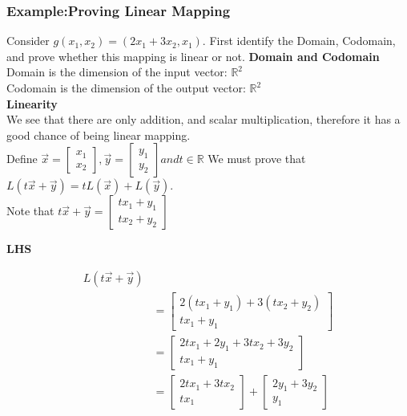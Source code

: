 \documentclass[12pt]{article}
\newcommand{\R}{\mathbb{R}}
\begin{document}
\subsubsection{Example:Proving Linear Mapping}
Consider $g(x_1,x_2) = (2x_1+3x_2 , x_1)$. First identify the Domain, Codomain, and prove whether this mapping is linear or not.
\noindent
\textbf{Domain and Codomain}\\
Domain is the dimension of the input vector: $\R^2$\\
Codomain is the dimension of the output vector: $\R^2$\\
\textbf{Linearity}\\
We see that there are only addition, and scalar multiplication, therefore it has a good chance of being linear mapping.\\
Define $\vec{x} = \begin{bmatrix}x_1\\x_2\end{bmatrix}, \vec{y} = \begin{bmatrix}y_1\\y_2\end{bmatrix} and t \in \R$
We must prove that $L(t\vec{x}+\vec{y}) =tL(\vec{x}) + L(\vec{y})$.\\
Note that $t\vec{x} + \vec{y} = \begin{bmatrix}tx_1+y_1\\tx_2+y_2\end{bmatrix}$\\
\begin{center}
\textbf{LHS}\\
\end{center}
\begin{equation}
\begin{split}
L(t\vec{x}+\vec{y}) \\
&= \begin{bmatrix}2(tx_1+y_1)+3(tx_2+y_2)\\tx_1+y_1\end{bmatrix}\\
&=\begin{bmatrix}2tx_1+2y_1+3tx_2+3y_2\\ tx_1+y_1\end{bmatrix}\\
&=\begin{bmatrix}2tx_1 + 3tx_2\\tx_1\end{bmatrix} + \begin{bmatrix}2y_1+3y_2\\y_1\end{bmatrix}
\end{split}
\end{equation}
	
\end{document}
